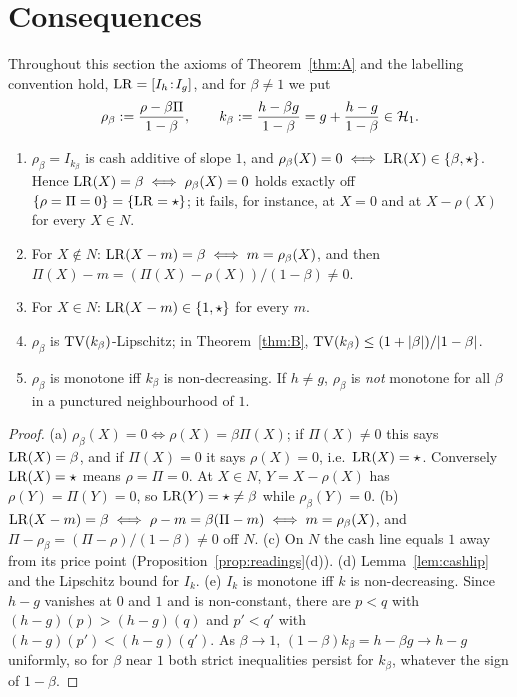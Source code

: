 \section{Consequences}\label{sec:consequences}

Throughout this section the axioms of Theorem~\ref{thm:A} and the labelling convention  hold, $\mathrm{LR}=[I_h\!:\!I_g]$, and for
$\beta\neq1$ we put
\[
 \rho_\beta:=\frac{\rho-\beta\Pi}{1-\beta},\qquad
 k_\beta:=\frac{h-\beta g}{1-\beta}=g+\frac{h-g}{1-\beta}\in\mathcal H_1 .
\]

\begin{corollary}[Association]\label{cor:assoc}
\begin{enumerate}[label=(\alph*),nosep]
\item $\rho_\beta=I_{k_\beta}$ is cash additive of slope $1$, and $\rho_\beta(X)=0\iff\mathrm{LR}(X)\in\{\beta,\star\}$.
  Hence $\mathrm{LR}(X)=\beta\iff\rho_\beta(X)=0$ holds exactly off $\{\rho=\Pi=0\}=\{\mathrm{LR}=\star\}$; it fails, for instance, at
  $X=0$ and at $X-\rho(X)$ for every $X\in N$.
\item For $X\notin N$: $\mathrm{LR}(X-m)=\beta\iff m=\rho_\beta(X)$, and then $\Pi(X)-m=(\Pi(X)-\rho(X))/(1-\beta)\ne0$.
\item For $X\in N$: $\mathrm{LR}(X-m)\in\{1,\star\}$ for every $m$.
\item $\rho_\beta$ is $\mathrm{TV}(k_\beta)$-Lipschitz; in Theorem~\ref{thm:B}, $\mathrm{TV}(k_\beta)\le(1+|\beta|)/|1-\beta|$.
\item $\rho_\beta$ is monotone iff $k_\beta$ is non-decreasing. If $h\ne g$, $\rho_\beta$ is \emph{not} monotone for
  all $\beta$ in a punctured neighbourhood of $1$.
\end{enumerate}
\end{corollary}

\begin{proof}
(a) $\rho_\beta(X)=0\iff\rho(X)=\beta\Pi(X)$; if $\Pi(X)\ne0$ this says $\mathrm{LR}(X)=\beta$, and if $\Pi(X)=0$ it says
$\rho(X)=0$, i.e.\ $\mathrm{LR}(X)=\star$. Conversely $\mathrm{LR}(X)=\star$ means $\rho=\Pi=0$. At $X\in N$, $Y=X-\rho(X)$ has
$\rho(Y)=\Pi(Y)=0$, so $\mathrm{LR}(Y)=\star\ne\beta$ while $\rho_\beta(Y)=0$.
(b) $\mathrm{LR}(X-m)=\beta\iff\rho-m=\beta(\Pi-m)\iff m=\rho_\beta(X)$, and
$\Pi-\rho_\beta=(\Pi-\rho)/(1-\beta)\neq0$ off $N$.
(c) On $N$ the cash line equals $1$ away from its price point (Proposition~\ref{prop:readings}(d)).
(d) Lemma~\ref{lem:cashlip} and the Lipschitz bound for $I_{k}$.
(e) $I_{k}$ is monotone iff $k$ is non-decreasing. Since $h-g$ vanishes at $0$ and $1$ and is non-constant, there are
$p<q$ with $(h-g)(p)>(h-g)(q)$ and $p'<q'$ with $(h-g)(p')<(h-g)(q')$. As $\beta\to1$,
$(1-\beta)k_\beta=h-\beta g\to h-g$ uniformly, so for $\beta$ near $1$ both strict inequalities persist for
$k_\beta$, whatever the sign of $1-\beta$. \qedhere
\end{proof}

